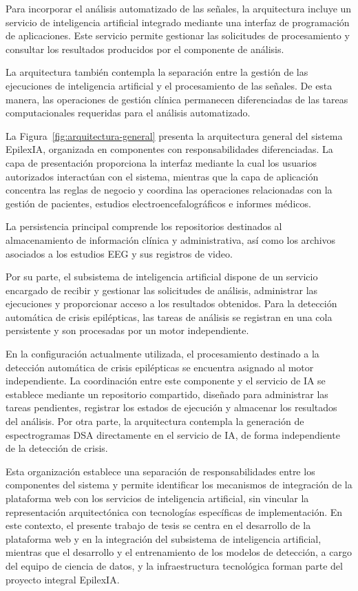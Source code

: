 Para incorporar el análisis automatizado de las señales,
la arquitectura incluye un servicio de inteligencia artificial
integrado mediante una interfaz de programación de aplicaciones.
Este servicio permite gestionar las solicitudes de procesamiento
y consultar los resultados producidos por el componente de análisis.

La arquitectura también contempla la separación entre la
gestión de las ejecuciones de inteligencia artificial y el
procesamiento de las señales. De esta manera, las operaciones
de gestión clínica permanecen diferenciadas de las tareas
computacionales requeridas para el análisis automatizado.

La Figura~\ref{fig:arquitectura-general} presenta la arquitectura general del sistema EpilexIA, organizada en componentes con responsabilidades diferenciadas. La capa de presentación proporciona la interfaz mediante la cual los usuarios autorizados interactúan con el sistema, mientras que la capa de aplicación concentra las reglas de negocio y coordina las operaciones relacionadas con la gestión de pacientes, estudios electroencefalográficos e informes médicos.

La persistencia principal comprende los repositorios destinados al almacenamiento de información clínica y administrativa, así como los archivos asociados a los estudios EEG y sus registros de video.

Por su parte, el subsistema de inteligencia artificial dispone de un servicio encargado de recibir y gestionar las solicitudes de análisis, administrar las ejecuciones y proporcionar acceso a los resultados obtenidos. Para la detección automática de crisis epilépticas, las tareas de análisis se registran en una cola persistente y son procesadas por un motor independiente.


En la configuración actualmente utilizada, el procesamiento destinado a la detección automática de crisis epilépticas se encuentra asignado al motor independiente. La coordinación entre este componente y el servicio de IA se establece mediante un repositorio compartido, diseñado para administrar las tareas pendientes, registrar los estados de ejecución y almacenar los resultados del análisis. Por otra parte, la arquitectura contempla la generación de espectrogramas DSA directamente en el servicio de IA, de forma independiente de la detección de crisis.


Esta organización establece una separación de responsabilidades entre los componentes del sistema y permite identificar los mecanismos de integración de la plataforma web con los servicios de inteligencia artificial, sin vincular la representación arquitectónica con tecnologías específicas de implementación. En este contexto, el presente trabajo de tesis se centra en el desarrollo de la plataforma web y en la integración del subsistema de inteligencia artificial, mientras que el desarrollo y el entrenamiento de los modelos de detección, a cargo del equipo de ciencia de datos, y la infraestructura tecnológica forman parte del proyecto integral EpilexIA.


